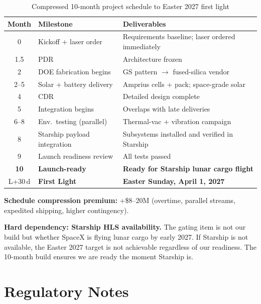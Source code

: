 \documentclass[10pt,letterpaper]{article}
\begin{document}
\begin{table}[!ht]
\centering\small
\caption{Compressed 10-month project schedule to Easter 2027 first light}
\label{tab:timeline}
\begin{tabular}{clp{7cm}}
\toprule
\textbf{Month} & \textbf{Milestone} & \textbf{Deliverables} \\
\midrule
0 & Kickoff + laser order & Requirements baseline; laser ordered immediately \\
1.5 & PDR & Architecture frozen \\
2 & DOE fabrication begins & GS pattern $\to$ fused-silica vendor \\
2--5 & Solar + battery delivery & Amprius cells + pack; space-grade solar \\
4 & CDR & Detailed design complete \\
5 & Integration begins & Overlaps with late deliveries \\
6--8 & Env.\ testing (parallel) & Thermal-vac + vibration campaign \\
8 & Starship payload integration & Subsystems installed and verified in Starship \\
9 & Launch readiness review & All tests passed \\
\textbf{10} & \textbf{Launch-ready} & \textbf{Ready for Starship lunar cargo flight} \\
L+30\,d & \textbf{First Light} & \textbf{Easter Sunday, April 1, 2027} \\
\bottomrule
\end{tabular}
\end{table}

\noindent \textbf{Schedule compression premium:} +\$8--20M (overtime, parallel
streams, expedited shipping, higher contingency).

\medskip
\noindent \textbf{Hard dependency: Starship HLS availability.} The gating item
is not our build but whether SpaceX is flying lunar cargo by early 2027.
If Starship is not available, the Easter 2027 target is not achievable
regardless of our readiness. The 10-month build ensures we are ready the
moment Starship is.

\section{Regulatory Notes}
\end{document}
